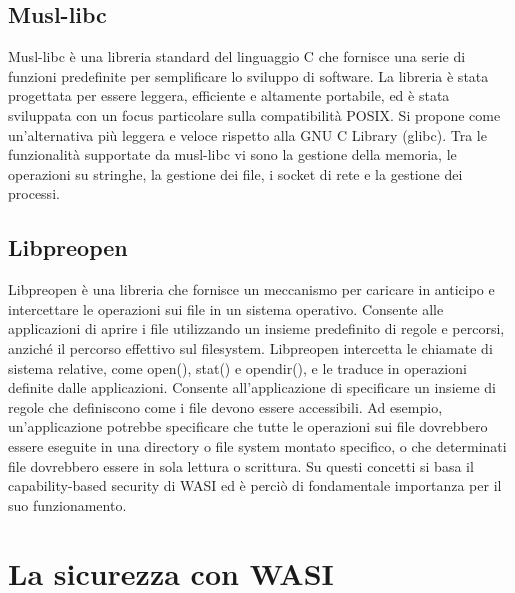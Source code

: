 \subsection{Musl-libc}
Musl-libc è una libreria standard del linguaggio C che fornisce una serie di funzioni predefinite per semplificare lo
sviluppo di software. La libreria è stata progettata per essere leggera, efficiente e altamente portabile, ed è stata
sviluppata con un focus particolare sulla compatibilità POSIX. Si propone come un'alternativa più leggera e veloce
rispetto alla GNU C Library (glibc). Tra le funzionalità supportate da musl-libc vi sono la gestione della memoria, le
operazioni su stringhe, la gestione dei file, i socket di rete e la gestione dei processi.
\subsection{Libpreopen}
\label{sec:libpreopen}
Libpreopen è una libreria che fornisce un meccanismo per caricare in anticipo e intercettare le operazioni sui file in
un sistema operativo. Consente alle applicazioni di aprire i file utilizzando un insieme predefinito di regole e
percorsi, anziché il percorso effettivo sul filesystem. Libpreopen intercetta le chiamate di sistema relative, come
open(), stat() e opendir(), e le traduce in operazioni definite dalle applicazioni. Consente all'applicazione di
specificare un insieme di regole che definiscono come i file devono essere accessibili. Ad esempio, un'applicazione
potrebbe specificare che tutte le operazioni sui file dovrebbero essere eseguite in una directory o file system montato
specifico, o che determinati file dovrebbero essere in sola lettura o scrittura. Su questi concetti si basa il
capability-based security di WASI ed è perciò di fondamentale importanza per il suo funzionamento.
\section{La sicurezza con WASI}
